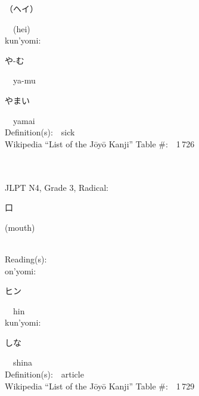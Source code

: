 \begin{multicols}{2}
{\hspace*{2em}}{\begin{CJK}{UTF8}{min} （ヘイ） \end{CJK}}\ \ (hei)\ \ \\
{\hspace*{1em}}kun'yomi:\ \ \\
{\hspace*{2em}}{\begin{CJK}{UTF8}{min} や-む \end{CJK}}\ \ ya-mu\ \ \\
{\hspace*{2em}}{\begin{CJK}{UTF8}{min} やまい \end{CJK}}\ \ yamai\ \ \\
Definition(s):\ \ sick \\
Wikipedia ``List of the J\=oy\=o Kanji'' Table \#:\ \ 1\,726 \\
\ \ \\
{\fontsize{34pt}{40pt}  }\ \ \\  %
{JLPT N4, Grade 3, Radical:\ \ {\begin{CJK}{UTF8}{min} 口 \end{CJK}} (mouth) } \\
Reading(s):\ \ \\
{\hspace*{1em}}on'yomi:\ \ \\
{\hspace*{2em}}{\begin{CJK}{UTF8}{min} ヒン \end{CJK}}\ \ hin\ \ \\
{\hspace*{1em}}kun'yomi:\ \ \\
{\hspace*{2em}}{\begin{CJK}{UTF8}{min} しな \end{CJK}}\ \ shina\ \ \\
Definition(s):\ \ article \\
Wikipedia ``List of the J\=oy\=o Kanji'' Table \#:\ \ 1\,729 \\
\ \ \\
{\fontsize{34pt}{40pt}  }\ \ \\  %

\end{multicols}
